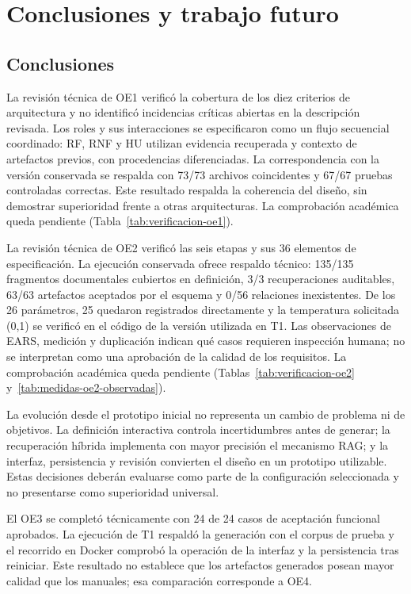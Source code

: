\chapter{Conclusiones y trabajo futuro}
\label{cap:conclusiones}

\section{Conclusiones}

La revisión técnica de OE1 verificó la cobertura de los diez criterios de arquitectura y no identificó incidencias críticas abiertas en la descripción revisada. Los roles y sus interacciones se especificaron como un flujo secuencial coordinado: RF, RNF y HU utilizan evidencia recuperada y contexto de artefactos previos, con procedencias diferenciadas. La correspondencia con la versión conservada se respalda con 73/73 archivos coincidentes y 67/67 pruebas controladas correctas. Este resultado respalda la coherencia del diseño, sin demostrar superioridad frente a otras arquitecturas. La comprobación académica queda pendiente (Tabla~\ref{tab:verificacion-oe1}).

La revisión técnica de OE2 verificó las seis etapas y sus 36 elementos de especificación. La ejecución conservada ofrece respaldo técnico: 135/135 fragmentos documentales cubiertos en definición, 3/3 recuperaciones auditables, 63/63 artefactos aceptados por el esquema y 0/56 relaciones inexistentes. De los 26 parámetros, 25 quedaron registrados directamente y la temperatura solicitada (0,1) se verificó en el código de la versión utilizada en T1. Las observaciones de EARS, medición y duplicación indican qué casos requieren inspección humana; no se interpretan como una aprobación de la calidad de los requisitos. La comprobación académica queda pendiente (Tablas~\ref{tab:verificacion-oe2} y~\ref{tab:medidas-oe2-observadas}).

La evolución desde el prototipo inicial no representa un cambio de problema ni de objetivos. La definición interactiva controla incertidumbres antes de generar; la recuperación híbrida implementa con mayor precisión el mecanismo RAG; y la interfaz, persistencia y revisión convierten el diseño en un prototipo utilizable. Estas decisiones deberán evaluarse como parte de la configuración seleccionada y no presentarse como superioridad universal.

El OE3 se completó técnicamente con 24 de 24 casos de aceptación funcional aprobados. La ejecución de T1 respaldó la generación con el corpus de prueba y el recorrido en Docker comprobó la operación de la interfaz y la persistencia tras reiniciar. Este resultado no establece que los artefactos generados posean mayor calidad que los manuales; esa comparación corresponde a OE4.


